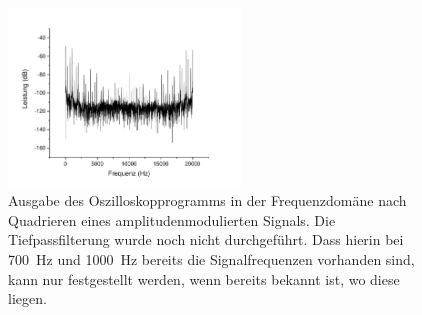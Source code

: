 \documentclass[
a4paper,
12pt,
pagesize,
ngerman
]{scrartcl}
\begin{document}

	\begin{figure}[H]  
		\includegraphics[width=0.55\textwidth]{Origin-Files/AM-Demod-Quadrat-preTP}
		\centering
		\caption{Ausgabe des Oszilloskopprogramms in der Frequenzdomäne nach Quadrieren eines amplitudenmodulierten Signals. Die Tiefpassfilterung wurde noch nicht durchgeführt.
		Dass hierin bei \SI{700}{\hertz} und \SI{1000}{\hertz} bereits die Signalfrequenzen vorhanden sind, kann nur festgestellt werden, wenn bereits bekannt ist, wo diese liegen.
		}
		\label{fig_tag3_am_demod_quadrat_preTP}
		\centering
	\end{figure}
\end{document}
